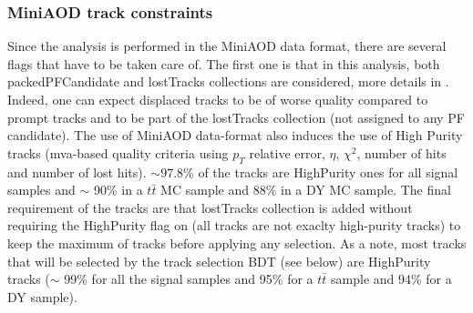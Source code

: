 \documentclass{cernatlasnote}
\begin{document}
        \subsubsection{MiniAOD track constraints}
        Since the analysis is performed in the MiniAOD data format, there are several flags that have to be taken care of. The first one is that in this analysis, both packedPFCandidate and lostTracks collections are considered, more details in \cite{MiniAOD}. Indeed, one can expect displaced tracks to be of worse quality compared to prompt tracks and to be part of the lostTracks collection (not assigned to any PF candidate). The use of MiniAOD data-format also induces the use of High Purity tracks  (mva-based quality criteria using $p_T$ relative error, $\eta$, $\chi^2$, number of hits and number of lost hits). $\sim 97.8$\% of the tracks are HighPurity ones for all signal samples and $\sim$ 90\% in a $t\bar{t}$ MC sample and 88\% in a DY MC sample. The final requirement of the tracks are that lostTracks collection is added without requiring the HighPurity flag on (all tracks are not exaclty high-purity tracks) to keep the maximum of tracks before applying any selection. As a note, most tracks that will be selected by the track selection BDT (see below) are HighPurity tracks ($\sim$ 99\% for all the signal samples and 95\% for a $t\bar{t}$ sample and 94\% for a DY sample).

        
\end{document}
